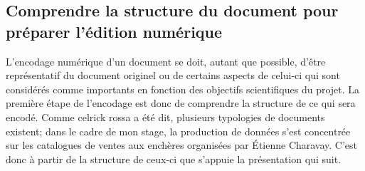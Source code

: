 \subsection{Comprendre la structure du document pour préparer l'édition numérique}
L'encodage numérique d'un document se doit, autant que possible, d'être représentatif du document originel ou de certains aspects de celui-ci qui sont considérés comme importants en fonction des objectifs scientifiques du projet. La première étape de l'encodage est donc de comprendre la structure de ce qui sera encodé. Comme celrick rossa a été dit, plusieurs typologies de documents existent; dans le cadre de mon stage, la production de données s'est concentrée sur les catalogues de ventes aux enchères organisées par Étienne Charavay. C'est donc à partir de la structure de ceux-ci que s'appuie la présentation qui suit.

